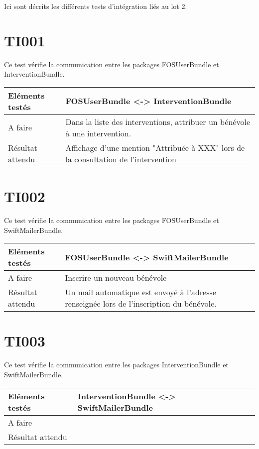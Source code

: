 
Ici sont décrits les différents tests d'intégration liés au lot 2.

\section{TI001}
	 Ce test vérifie la communication entre les packages FOSUserBundle et InterventionBundle.
	 \begin{center}
     	\begin{tabular}[h]{|p{}|p{}|}
		\hline
			Eléments testés & FOSUserBundle <-> InterventionBundle \\\hline
    			A faire & Dans la liste des interventions, attribuer un bénévole à une intervention. \\\hline
    			Résultat attendu & Affichage d'une mention "Attribuée à XXX" lors de la consultation de l'intervention \\\hline
     	\end{tabular}
  	\end{center}	
  	
\section{TI002}
	 Ce test vérifie la communication entre les packages FOSUserBundle et SwiftMailerBundle.
	 \begin{center}
     	\begin{tabular}[h]{|p{}|p{}|}
		\hline
			Eléments testés & FOSUserBundle <-> SwiftMailerBundle \\\hline
    			A faire & Inscrire un nouveau bénévole \\\hline
    			Résultat attendu & Un mail automatique est envoyé à l'adresse renseignée lors de l'inscription du bénévole. \\\hline
     	\end{tabular}
  	\end{center}	
  	
  	
 \section{TI003}
	 Ce test vérifie la communication entre les packages InterventionBundle et SwiftMailerBundle.
	 \begin{center}
     	\begin{tabular}[h]{|p{}|p{}|}
		\hline
			Eléments testés & InterventionBundle <-> SwiftMailerBundle \\\hline
    			A faire & \\\hline
    			Résultat attendu & \\\hline
     	\end{tabular}
  	\end{center}		
